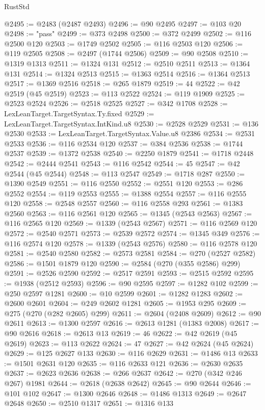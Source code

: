 \begin{lexlean}{RustStd}
\begin{coremodule}
@2495 := @2483 (@2487 @2493)
@2496 := @90 @2495
@2497 := @103 @20
@2498 := "pass"
@2499 := @373 @2498
@2500 := @372 @2499
@2502 := @116 @2500 @120
@2503 := @1749 @2502
@2505 := @116 @2503 @120
@2506 := @119 @2505
@2508 := @2497 (@1744 @2506)
@2509 := @90 @2508
@2510 := @1319 @1313
@2511 := @1324 @131
@2512 := @2510 @2511
@2513 := @1364 @131
@2514 := @1324 @2513
@2515 := @1363 @2514
@2516 := @1364 @2513
@2517 := @1369 @2516
@2518 := @265 @1879
@2519 := 44
@2522 := @42 @2519 (@45 @2519)
@2523 := @113 @2522
@2524 := @119 @1909
@2525 := @2523 @2524
@2526 := @2518 @2525
@2527 := @342 @1708
@2528 := LexLeanTarget.TargetSyntax.Ty.fixed
@2529 := LexLeanTarget.TargetSyntax.IntKind.u8
@2530 := @2528 @2529
@2531 := @136 @2530
@2533 := LexLeanTarget.TargetSyntax.Value.u8 @2386
@2534 := @2531 @2533
@2536 := @116 @2534 @120
@2537 := @384 @2536
@2538 := @1744 @2537
@2539 := @1372 @2538
@2540 := @2250 @1879
@2541 := @1718 @2448
@2542 := @2444 @2541
@2543 := @116 @2542
@2544 := 45
@2547 := @42 @2544 (@45 @2544)
@2548 := @113 @2547
@2549 := @1718 @287
@2550 := @1390 @2549
@2551 := @116 @2550
@2552 := @2551 @120
@2553 := @286 @2552
@2554 := @119 @2553
@2555 := @1388 @2554
@2557 := @116 @2555 @120
@2558 := @2548 @2557
@2560 := @116 @2558 @293
@2561 := @1383 @2560
@2563 := @116 @2561 @120
@2565 := @1345 (@2543 @2563)
@2567 := @116 @2565 @120
@2569 := @1339 (@2543 @2567)
@2571 := @116 @2569 @120
@2572 := @2540 @2571
@2573 := @2539 @2572
@2574 := @1345 @349
@2576 := @116 @2574 @120
@2578 := @1339 (@2543 @2576)
@2580 := @116 @2578 @120
@2581 := @2540 @2580
@2582 := @2573 @2581
@2584 := @270 (@2527 @2582)
@2586 := @1501 @1879 @120
@2590 := @2584 (@270 (@355 @2586) @299)
@2591 := @2526 @2590
@2592 := @2517 @2591
@2593 := @2515 @2592
@2595 := @1938 (@2512 @2593)
@2596 := @90 @2595
@2597 := @1282 @102
@2599 := @250 @2597 @1281
@2600 := @10 @2599
@2601 := @1282 @1283
@2602 := @2600 @2601
@2604 := @249 @2602 @1281
@2605 := @1953 @295
@2609 := @275 (@270 (@282 @2605) @299)
@2611 := @2604 (@2408 @2609)
@2612 := @90 @2611
@2613 := @1300 @2597
@2616 := @2613 @1281 (@1383 @2008)
@2617 := @90 @2616
@2618 := @2613 @13
@2619 := 46
@2622 := @42 @2619 (@45 @2619)
@2623 := @113 @2622
@2624 := 47
@2627 := @42 @2624 (@45 @2624)
@2629 := @125 @2627 @133
@2630 := @116 @2629
@2631 := @1486 @13
@2633 := @1501 @2631 @120
@2635 := @116 @2633 @121
@2636 := @2630 @2635
@2637 := @2623 @2636
@2638 := @266 @2637
@2642 := @270 (@342 @246 @267) @1981
@2644 := @2618 (@2638 @2642)
@2645 := @90 @2644
@2646 := @101 @102
@2647 := @1300 @2646
@2648 := @1486 @1313
@2649 := @2647 @2648
@2650 := @2510 @1317
@2651 := @1316 @133

\end{coremodule}
\end{lexlean}
